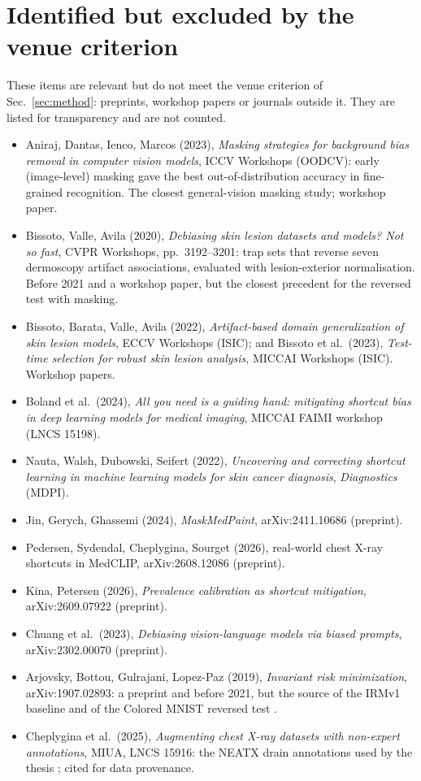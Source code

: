 \documentclass[11pt,a4paper]{article}
\begin{document}
\appendix
\section{Identified but excluded by the venue criterion}\label{app:excluded}
These items are relevant but do not meet the venue criterion of Sec.~\ref{sec:method}: preprints, workshop papers or
journals outside it. They are listed for transparency and are not counted.
\begin{itemize}[itemsep=1pt]
\item Aniraj, Dantas, Ienco, Marcos (2023), \emph{Masking strategies for background bias removal in computer vision
models}, ICCV Workshops (OODCV): early (image-level) masking gave the best out-of-distribution accuracy in fine-grained
recognition. The closest general-vision masking study; workshop paper.
\item Bissoto, Valle, Avila (2020), \emph{Debiasing skin lesion datasets and models? Not so fast}, CVPR Workshops,
pp.~3192--3201: trap sets that reverse seven dermoscopy artifact associations, evaluated with lesion-exterior
normalisation. Before 2021 and a workshop paper, but the closest precedent for the reversed test with masking.
\item Bissoto, Barata, Valle, Avila (2022), \emph{Artifact-based domain generalization of skin lesion models}, ECCV
Workshops (ISIC); and Bissoto et al.\ (2023), \emph{Test-time selection for robust skin lesion analysis}, MICCAI
Workshops (ISIC). Workshop papers.
\item Boland et al.\ (2024), \emph{All you need is a guiding hand: mitigating shortcut bias in deep learning models for
medical imaging}, MICCAI FAIMI workshop (LNCS 15198).
\item Nauta, Walsh, Dubowski, Seifert (2022), \emph{Uncovering and correcting shortcut learning in machine learning
models for skin cancer diagnosis}, \emph{Diagnostics} (MDPI).
\item Jin, Gerych, Ghassemi (2024), \emph{MaskMedPaint}, arXiv:2411.10686 (preprint).
\item Pedersen, Sydendal, Cheplygina, Sourget (2026), real-world chest X-ray shortcuts in MedCLIP, arXiv:2608.12086
(preprint).
\item Kina, Petersen (2026), \emph{Prevalence calibration as shortcut mitigation}, arXiv:2609.07922 (preprint).
\item Chuang et al.\ (2023), \emph{Debiasing vision-language models via biased prompts}, arXiv:2302.00070 (preprint).
\item Arjovsky, Bottou, Gulrajani, Lopez-Paz (2019), \emph{Invariant risk minimization}, arXiv:1907.02893: a preprint and
before 2021, but the source of the IRMv1 baseline and of the Colored MNIST reversed test \citep{arjovsky2019irm}.
\item Cheplygina et al.\ (2025), \emph{Augmenting chest X-ray datasets with non-expert annotations}, MIUA, LNCS 15916:
the NEATX drain annotations used by the thesis \citep{cheplygina2025neatx}; cited for data provenance.
\end{itemize}
\end{document}
